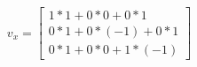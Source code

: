 \documentclass[preview]{standalone}
\begin{document}
\begin{align*}
v_x=\begin{bmatrix}
                        1*1+0*0+0*1\\
                        0*1+0*( -1) +0*1\\
                        0*1+0*0+1*( -1)
                        \end{bmatrix}\\
\end{align*}
\end{document}
